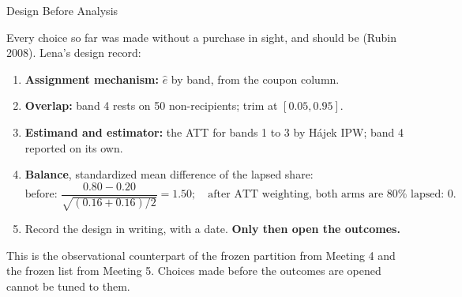 \documentclass[aspectratio=169, 11pt, handout]{beamer}
\begin{document}
\begin{frame}{Design Before Analysis}

Every choice so far was made without a purchase in sight, and should be (Rubin 2008). Lena's design record:

\begin{enumerate}
  \item \textbf{Assignment mechanism:} $\hat e$ by band, from the coupon column.
  \item \textbf{Overlap:} band 4 rests on 50 non-recipients; trim at $[0.05, 0.95]$.
  \item \textbf{Estimand and estimator:} the ATT for bands 1 to 3 by H\'ajek IPW; band 4 reported on its own.
  \item \textbf{Balance}, standardized mean difference of the lapsed share:
  \[
  \text{before: } \frac{0.80 - 0.20}{\sqrt{(0.16 + 0.16)/2}} = 1.50; \quad \text{after ATT weighting, both arms are } 80\% \text{ lapsed: } 0 .
  \]
  \item Record the design in writing, with a date. \textbf{Only then open the outcomes.}
\end{enumerate}

\medskip

This is the observational counterpart of the frozen partition from Meeting 4 and the frozen list from Meeting 5. Choices made before the outcomes are opened cannot be tuned to them.
\end{frame}
\end{document}
